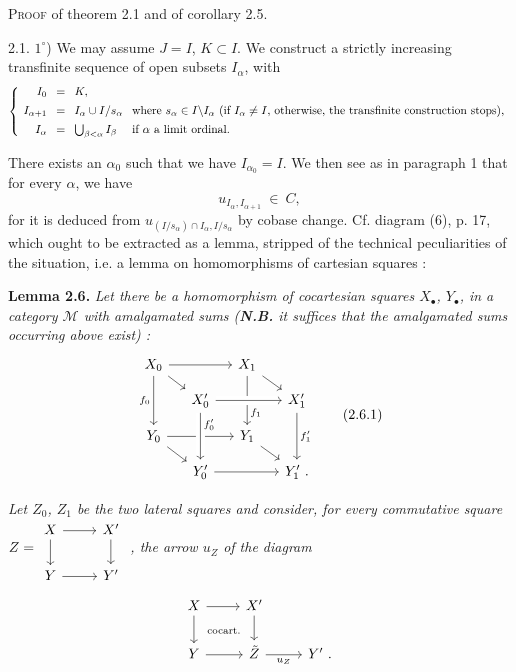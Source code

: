 \documentclass[11pt]{article}
\newcommand{\printedpage}[1]{\marginpar{\footnotesize p.~#1}}
\newcommand{\msp}[1]{\marginpar{\footnotesize [#1]}}
\newcommand{\M}{\mathcal{M}}
\begin{document}
\printedpage{17}

\msp{page 30}

\textsc{Proof} of theorem 2.1 and of corollary 2.5.

2.1. $1^\circ$) We may assume $J = I$, $K \subset I$. We construct a strictly increasing transfinite sequence of open subsets $I_\alpha$, with
\[
\left\{
\setlength{\arraycolsep}{4pt}
\begin{array}{rcll}
I_0 & = & K, & \\[1ex]
I_{\alpha+1} & = & I_\alpha \cup I/s_\alpha & \text{where } s_\alpha \in I\backslash I_\alpha \text{ (if } I_\alpha \neq I\text{, otherwise, the transfinite construction stops),}\\[1ex]
I_\alpha & = & \bigcup_{\beta<\alpha} I_\beta & \text{if } \alpha \text{ a limit ordinal.}
\end{array}
\right.
\]

There exists an $\alpha_0$ such that we have $I_{\alpha_0} = I$. We then see as in paragraph 1
\msp{page 31}
that for every $\alpha$, we have
\[
u_{I_\alpha,I_{\alpha+1}} \ \in\ C,
\tag*{$(*)$}
\]
for it is deduced from $u_{(I/s_\alpha)\cap I_\alpha,I/s_\alpha}$ by cobase change. Cf. diagram (6), p. 17, which ought to be extracted as a lemma, stripped of the technical peculiarities of the situation, i.e. a lemma on homomorphisms of cartesian squares :

\textbf{Lemma 2.6.} \textit{Let there be a homomorphism of cocartesian squares $X_\bullet$, $Y_\bullet$, in a category $\M$ with amalgamated sums (\textbf{N.B.} it suffices that the amalgamated sums occurring above exist) :}
\[
\begin{tikzcd}[row sep=small, column sep=small]
X_0 \arrow[rr] \arrow[dr] \arrow[dd, "f_0"'] & & X_1 \arrow[dr] \arrow[dd, "f_1" near end] & \\
 & X'_0 \arrow[rr, crossing over] & & X'_1 \arrow[dd, "f'_1"] \\
Y_0 \arrow[rr] \arrow[dr] & & Y_1 \arrow[dr] & \\
 & Y'_0 \arrow[rr] \arrow[from=uu, crossing over, "f'_0" near start] & & Y'_1 \ .
\end{tikzcd}
\tag*{(2.6.1)}
\]

\textit{Let $Z_0$, $Z_1$ be the two lateral squares and consider, for every commutative square}
$Z = \begin{tikzcd}[ampersand replacement=\&, baseline=(\tikzcdmatrixname.center)]
X \arrow[r] \arrow[d] \& X' \arrow[d] \\
Y \arrow[r] \& Y'
\end{tikzcd}$ \textit{, the arrow $u_Z$ of the diagram}
\[
\begin{tikzcd}
X \arrow[r] \arrow[d] \arrow[dr, phantom, "\text{\scriptsize cocart.}"] & X' \arrow[d] & \\
Y \arrow[r] & \tilde{Z} \arrow[r, "u_Z"'] & Y' \ .
\end{tikzcd}
\]
\end{document}
